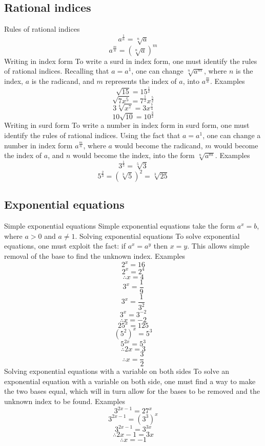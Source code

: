\begin{outline}
\subsection{Rational indices}
	 \1 Rules of rational indices
		\[a^{\frac{1}{n}} = \sqrt[n]{a}\]
		\[a^{\frac{m}{n}} = (\sqrt[n]{a})^m\]
	 	\2 Writing in index form
		 	 \3 To write a surd in index form, one must identify the rules of rational indices. Recalling that $a = a^1$, one can change $\sqrt[n]{a^m}$, where $n$ is the index, $a$ is the radicand, and $m$ represents the index of $a$, into $a^{\frac{m}{n}}$.
		 	 	 \4 Examples
	 	 	 	 	 \[\sqrt{15} = 15^{\frac{1}{2}}\]
	 	 	 	 	 \[\sqrt{7x^5} = 7^{\frac{1}{2}}x^{\frac{5}{2}}\]
	 	 	 	 	 \[3\sqrt[4]{x^7} = 3x^{\frac{7}{4}}\]
	 	 	 	 	 \[10\sqrt{10} = 10^{\frac{3}{2}}\]
	 	\2 Writing in surd form
	 	 	\3 To write a number in index form in surd form, one must identify the rules of rational indices. Using the fact that $a = a^1$, one can change a number in index form $a^{\frac{m}{n}}$, where $a$ would become the radicand, $m$ would become the index of $a$, and $n$ would become the index, into the form $\sqrt[n]{a^m}$.
	 	 	 	\4 Examples
	 	 	 	 	\[3^{\frac{1}{5}} = \sqrt[5]{3}\]
	 	 	 	 	\[5^{\frac{2}{3}} = \left(\sqrt[3]{5}\right)^2 = \sqrt[3]{25}\]

\0
\subsection{Exponential equations}
	\1 Simple exponential equations
	 	\2 Simple exponential equations take the form $a^x = b$, where $a > 0$ and $a \neq 1$.
	\1 Solving exponential equations
		\2 To solve exponential equations, one must exploit the fact: if $a^x = a^y$ then $x = y$. This allows simple removal of the base to find the unknown index.
			\3 Examples
				\[2^x = 16\]
				\[2^x = 2^4\]
				\[\therefore x = 4\]
				\[\]
				\[3^x = \frac{1}{9}\]
				\[3^x = \frac{1}{3^2}\]
				\[3^x = 3^{-2}\]
				\[\therefore x = -2\]
				\[\]
				\[25^x = 125\]
				\[(5^2)^x = 5^3\]
				\[5^{2x} = 5^3\]
				\[\therefore 2x = 3\]
				\[\therefore x = \frac{3}{2}\]
	\1 Solving exponential equations with a variable on both sides
		\2 To solve an exponential equation with a variable on both side, one must find a way to make the two bases equal, which will in turn allow for the bases to be removed and the unknown index to be found.
			\3 Examples
				\[3^{2x-1} = 27^x\]
				\[3^{2x-1} = (3^3)^x\]
				\[3^{2x - 1} = 3^{3x}\]
				\[\therefore 2x - 1 = 3x\]
				\[\therefore x = -1\]


\end{outline}
